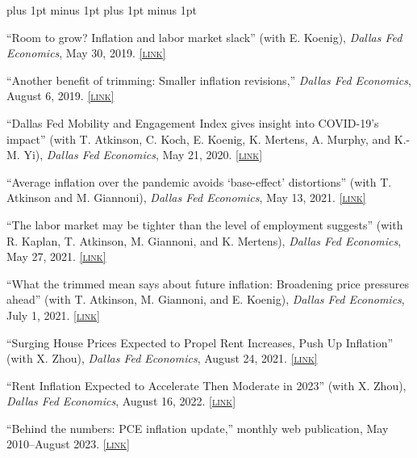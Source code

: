 \documentclass[letterpaper]{article}
\renewenvironment{itemize}{
  \begin{list}{}{
    \setlength{\leftmargin}{1.5em}
    \itemsep -1pt plus 1pt minus 1pt
    \topsep -1pt plus 1pt minus 1pt
  }
}{
  \end{list}
}
\newcommand{\link}[1]{\href{#1}{\scriptsize\textsc{[link]}}}
\begin{document}
\begin{itemize}
\item ``Room to grow? Inflation and labor market slack'' (with E. Koenig), \textit{Dallas Fed Economics}, May 30, 2019. \link{https://www.dallasfed.org/research/economics/2019/0530}

\item ``Another benefit of trimming: Smaller inflation revisions,'' \textit{Dallas Fed Economics}, August 6, 2019. \link{https://www.dallasfed.org/research/economics/2019/0806}

\item ``Dallas Fed Mobility and Engagement Index gives insight into COVID-19's impact'' (with T. Atkinson, C. Koch, E. Koenig, K. Mertens, A. Murphy, and K.-M. Yi), \textit{Dallas Fed Economics}, May 21, 2020. \link{https://www.dallasfed.org/research/economics/2020/0521}

\item ``Average inflation over the pandemic avoids `base-effect' distortions'' (with T. Atkinson and M. Giannoni), \textit{Dallas Fed Economics}, May 13, 2021. \link{https://www.dallasfed.org/research/economics/2021/0513}

\item ``The labor market may be tighter than the level of employment suggests'' (with R. Kaplan, T. Atkinson, M. Giannoni, and K. Mertens), \textit{Dallas Fed Economics}, May 27, 2021. \link{https://www.dallasfed.org/research/economics/2021/0527}

\item ``What the trimmed mean says about future inflation: Broadening price pressures ahead'' (with T. Atkinson, M. Giannoni, and E. Koenig), \textit{Dallas Fed Economics}, July 1, 2021. \link{https://www.dallasfed.org/research/economics/2021/0701}

\item ``Surging House Prices Expected to Propel Rent Increases, Push Up Inflation'' (with X. Zhou), \textit{Dallas Fed Economics}, August 24, 2021. \link{https://www.dallasfed.org/research/economics/2021/0824}

\item ``Rent Inflation Expected to Accelerate Then Moderate in 2023'' (with X. Zhou), \textit{Dallas Fed Economics}, August 16, 2022. \link{https://www.dallasfed.org/research/economics/2022/0816}

\item ``Behind the numbers: PCE inflation update,'' monthly web publication, May 2010--August 2023.  \link{http://dallasfed.org/research/pce/inflation.cfm} 
\end{itemize}
\end{document}
